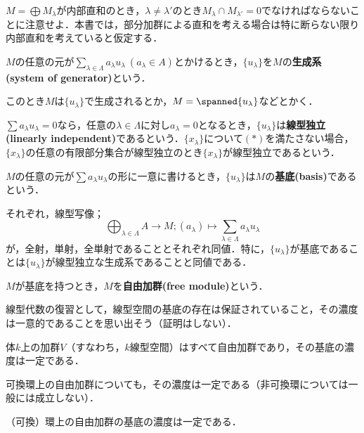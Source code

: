 $M=\bigoplus M_\lambda$が内部直和のとき，$\lambda\neq\lambda'$のとき$M_\lambda\cap M_{\lambda'}=0$でなければならないことに注意せよ．本書では，部分加群による直和を考える場合は特に断らない限り内部直和を考えていると仮定する．

\begin{defi}[生成系]
	$M$の任意の元が$\sum_{\lambda\in\Lambda}a_\lambda u_\lambda ~(a_\lambda\in A)$とかけるとき，$\{u_\lambda\}$を$M$の\textbf{生成系(system of generator)}という．
\end{defi}

このとき$M$は$\{u_\lambda\}$で生成されるとか，$M=\spanned{u_\lambda}$などとかく．
\begin{defi}[線型独立]
	$\sum a_\lambda u_\lambda=0$なら，任意の$\lambda\in\Lambda$に対し$a_\lambda=0$となるとき，$\{u_\lambda\}$は\textbf{線型独立(linearly independent)}であるという．$\{x_\lambda\}$について$(\ast)$を満たさない場合，$\{x_\lambda\}$の任意の有限部分集合が線型独立のとき$\{x_\lambda\}$が線型独立であるという．
\end{defi}
\begin{defi}[基底]
	$M$の任意の元が$\sum a_\lambda u_\lambda$の形に一意に書けるとき，$\{u_\lambda\}$は$M$の\textbf{基底(basis)}であるという．	
\end{defi}

それぞれ，線型写像；
\[\bigoplus_{\lambda\in\Lambda} A\to M;(a_\lambda)\mapsto\sum_{\lambda\in\Lambda} a_\lambda u_\lambda\]
が，全射，単射，全単射であることとそれぞれ同値．特に，$\{u_\lambda\}$が基底であることは$\{u_\lambda\}$が線型独立な生成系であることと同値である．

\begin{defi}[自由加群]
	$M$が基底を持つとき，$M$を\textbf{自由加群(free module)}という．
\end{defi}

線型代数の復習として，線型空間の基底の存在は保証されていること，その濃度は一意的であることを思い出そう（証明はしない）．
\begin{thm}
	体$k$上の加群$V$（すなわち，$k$線型空間）はすべて自由加群であり，その基底の濃度は一定である．
\end{thm}

可換環上の自由加群についても，その濃度は一定である（非可換環については一般には成立しない）．

\begin{thm}
	（可換）環上の自由加群の基底の濃度は一定である．
\end{thm}

